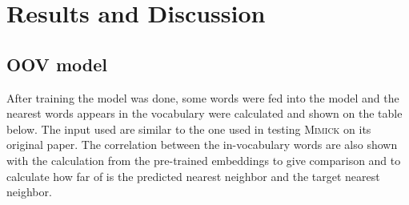 \chapter{Results and Discussion}
\label{chap:results}
    \section{OOV model}
        After training the model was done, some words were fed into
        the model and the nearest words appears in the vocabulary were
        calculated and shown on the table below. The input used are
        similar to the one used in testing \textsc{Mimick} on its
        original paper. The correlation between the in-vocabulary
        words are also shown with the calculation from the pre-trained
        embeddings to give comparison and to calculate how far of is
        the predicted nearest neighbor and the target nearest neighbor.


